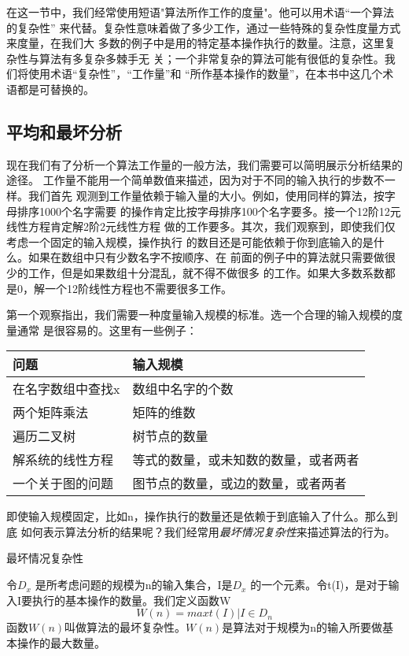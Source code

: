 在这一节中，我们经常使用短语"算法所作工作的度量"。他可以用术语“一个算法的复杂性”
来代替。复杂性意味着做了多少工作，通过一些特殊的复杂性度量方式来度量，在我们大
多数的例子中是用的特定基本操作执行的数量。注意，这里复杂性与算法有多复杂多棘手无
关；一个非常复杂的算法可能有很低的复杂性。我们将使用术语“复杂性”，“工作量”和
“所作基本操作的数量”，在本书中这几个术语都是可替换的。

\subsection{平均和最坏分析}
现在我们有了分析一个算法工作量的一般方法，我们需要可以简明展示分析结果的途径。
工作量不能用一个简单数值来描述，因为对于不同的输入执行的步数不一样。我们首先
观测到工作量依赖于输入量的大小。例如，使用同样的算法，按字母排序1000个名字需要
的操作肯定比按字母排序100个名字要多。接一个12阶12元线性方程肯定解2阶2元线性方程
做的工作要多。其次，我们观察到，即使我们仅考虑一个固定的输入规模，操作执行
的数目还是可能依赖于你到底输入的是什么。如果在数组中只有少数名字不按顺序、在
前面的例子中的算法就只需要做很少的工作，但是如果数组十分混乱，就不得不做很多
的工作。如果大多数系数都是0，解一个12阶线性方程也不需要很多工作。

第一个观察指出，我们需要一种度量输入规模的标准。选一个合理的输入规模的度量通常
是很容易的。这里有一些例子：

\begin{tabular}{ll}
\hline
问题  &输入规模 \\
\hline
在名字数组中查找x   &数组中名字的个数\\
两个矩阵乘法 &矩阵的维数\\
遍历二叉树  &树节点的数量\\
解系统的线性方程 &等式的数量，或未知数的数量，或者两者\\
一个关于图的问题 &图节点的数量，或边的数量，或者两者\\
\hline
\end{tabular}

\noindent
即使输入规模固定，比如n，操作执行的数量还是依赖于到底输入了什么。那么到底
如何表示算法分析的结果呢？我们经常用\emph{最坏情况复杂性}来描述算法的行为。

\begin{definition}
最坏情况复杂性

令$D_x$ 是所考虑问题的规模为n的输入集合，I是$D_x$
的一个元素。令t(I)，是对于输入I要执行的基本操作的数量。我们定义函数W
\begin{displaymath}
    W(n)=max{t(I)|I\in D_n}
\end{displaymath}
函数$W(n)$叫做算法的最坏复杂性。$W(n)$是算法对于规模为n的输入所要做基本操作的最大数量。
\end{definition}

